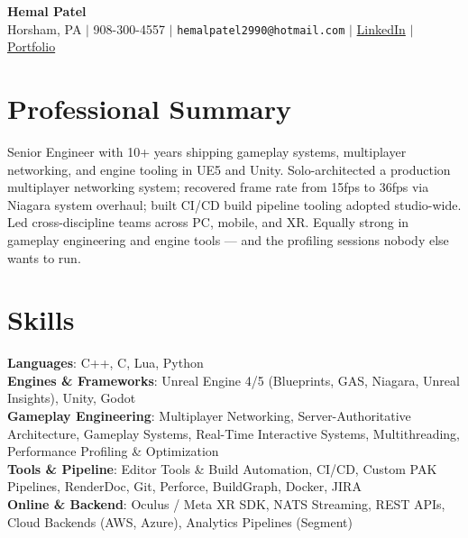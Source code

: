 \documentclass[letterpaper,11pt]{article}
\begin{document}
	
	\begin{center}
		\textbf{\Huge Hemal Patel} \\ \vspace{1pt}
		\small Horsham, PA $|$ 908-300-4557 $|$ \nolinkurl{hemalpatel2990@hotmail.com} $|$
		\href{https://linkedin.com/in/hemalpatel2990}{LinkedIn} $|$
		\href{https://hemalpatel2990.github.io/}{Portfolio}
	\end{center}
	
	\section*{Professional Summary}
	\small {Senior Engineer with 10+ years shipping gameplay systems, multiplayer networking, and engine tooling in UE5 and Unity. Solo-architected a production multiplayer networking system; recovered frame rate from 15fps to 36fps via Niagara system overhaul; built CI/CD build pipeline tooling adopted studio-wide. Led cross-discipline teams across PC, mobile, and XR. Equally strong in gameplay engineering and engine tools --- and the profiling sessions nobody else wants to run.}
	
	
	\section*{Skills}
	\begin{itemize}[leftmargin=0.15in, label={}]
		\small{\item{
				\textbf{Languages}{: C++, C, Lua, Python} \\
				\textbf{Engines \& Frameworks}{: Unreal Engine 4/5 (Blueprints, GAS, Niagara, Unreal Insights), Unity, Godot} \\
				\textbf{Gameplay Engineering}{: Multiplayer Networking, Server-Authoritative Architecture, Gameplay Systems, Real-Time Interactive Systems, Multithreading, Performance Profiling \& Optimization} \\
				\textbf{Tools \& Pipeline}{: Editor Tools \& Build Automation, CI/CD, Custom PAK Pipelines, RenderDoc, Git, Perforce, BuildGraph, Docker, JIRA} \\
				\textbf{Online \& Backend}{: Oculus / Meta XR SDK, NATS Streaming, REST APIs, Cloud Backends (AWS, Azure), Analytics Pipelines (Segment)} \\
		}}
	\end{itemize}
	
\end{document}
